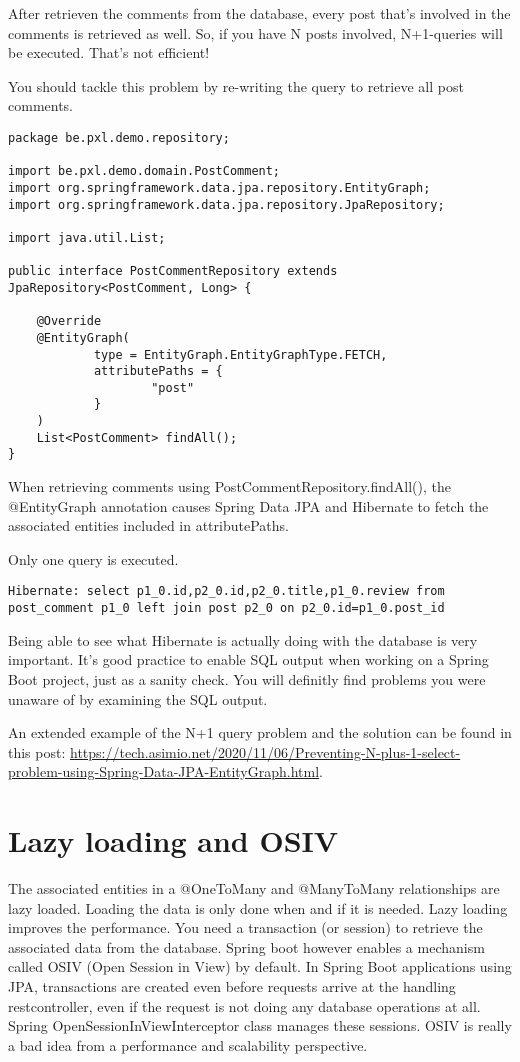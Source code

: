 After retrieven the comments from the database, every post that's involved in the comments is retrieved as well. So, if you have N posts involved, N+1-queries will be executed. That's not efficient!

You should tackle this problem by re-writing the query to retrieve all post comments.

\begin{lstlisting}
package be.pxl.demo.repository;

import be.pxl.demo.domain.PostComment;
import org.springframework.data.jpa.repository.EntityGraph;
import org.springframework.data.jpa.repository.JpaRepository;

import java.util.List;

public interface PostCommentRepository extends JpaRepository<PostComment, Long> {

    @Override
    @EntityGraph(
            type = EntityGraph.EntityGraphType.FETCH,
            attributePaths = {
                    "post"
            }
    )
    List<PostComment> findAll();
}
\end{lstlisting}

When retrieving comments using PostCommentRepository.findAll(), the @EntityGraph annotation causes Spring Data JPA and Hibernate to fetch the associated entities included in attributePaths.

Only one query is executed.

\begin{lstlisting}
Hibernate: select p1_0.id,p2_0.id,p2_0.title,p1_0.review from post_comment p1_0 left join post p2_0 on p2_0.id=p1_0.post_id
\end{lstlisting}

Being able to see what Hibernate is actually doing with the database is very important.
It's good practice to enable SQL output when working on a Spring Boot project, just as a sanity check. 
You will definitly find problems you were unaware of by examining the SQL output.

An extended example of the N+1 query problem and the solution can be found in this post: \url{https://tech.asimio.net/2020/11/06/Preventing-N-plus-1-select-problem-using-Spring-Data-JPA-EntityGraph.html}.

\section{Lazy loading and OSIV}

The associated entities in a @OneToMany and @ManyToMany relationships are lazy loaded. Loading the data is only done when and if it is needed. Lazy loading improves the performance. You need a transaction (or session) to retrieve the associated data from the database.
Spring boot however enables a mechanism called OSIV (Open Session in View) by default. In Spring Boot applications using JPA, transactions are created even before requests arrive at the handling restcontroller, even if the request is not doing any database operations at all. Spring OpenSessionInViewInterceptor class manages these sessions. OSIV is really a bad idea from a performance and scalability perspective.

